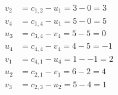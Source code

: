 \[
\begin{aligned}
v_{2} &= c_{1,2} - u_{1} = 3 - 0 = 3 \\
v_{4} &= c_{1,4} - u_{1} = 5 - 0 = 5 \\
u_{3} &= c_{3,4} - v_{4} = 5 - 5 = 0 \\
u_{4} &= c_{4,4} - v_{4} = 4 - 5 = -1 \\
v_{1} &= c_{4,1} - u_{4} = 1 - -1 = 2 \\
u_{2} &= c_{2,1} - v_{1} = 6 - 2 = 4 \\
v_{3} &= c_{2,3} - u_{2} = 5 - 4 = 1 \\
\end{aligned}
\]

